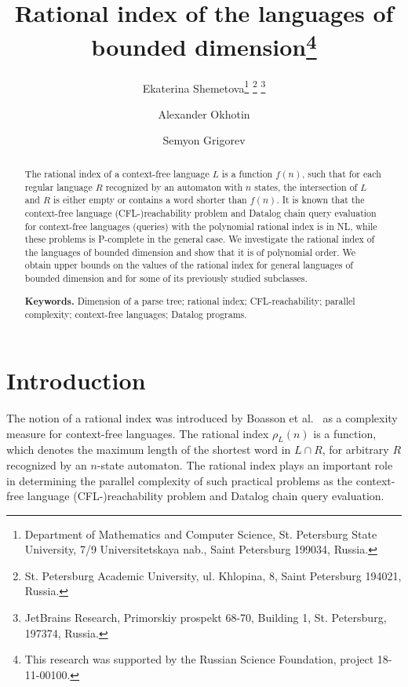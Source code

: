 \documentclass[11pt,a4paper]{article} %
\begin{document}
\sloppy

\title{Rational index of the languages of bounded dimension\footnote{%
This research was supported by the Russian Science Foundation, project 18-11-00100.}}

\author{Ekaterina Shemetova\footnote{%
Department of Mathematics and Computer Science, St. Petersburg State University, 
7/9 Universitetskaya nab., Saint Petersburg 199034, Russia.}
\footnote{%
St. Petersburg Academic University, 
ul. Khlopina, 8, Saint Petersburg 194021, Russia.}
\footnote{%
JetBrains Research,
Primorskiy prospekt 68-70, Building 1, St. Petersburg, 197374, Russia.}
\and
Alexander Okhotin\footnotemark[2]
\and
Semyon Grigorev\footnotemark[2] \footnotemark[4]
}

\maketitle


\begin{abstract}
The rational index of a context-free language  $L$ is a function $f(n)$, such that for each regular language $R$ recognized by an automaton with $n$ states, the intersection of $L$ and $R$ is either empty or contains a word shorter than $f(n)$. It is known that the context-free language (CFL-)reachability problem and Datalog chain query evaluation for context-free languages (queries) with the polynomial rational index is in NL, while these problems is P-complete in the general case. We investigate the rational index of the languages of bounded dimension and show that it is of polynomial order. We obtain upper bounds on the values of the rational index for general languages of bounded dimension and for some of its previously studied subclasses.

\textbf{Keywords.}
Dimension of a parse tree; rational index; CFL-reachability; parallel complexity; context-free languages; Datalog programs.
\end{abstract}


\section{Introduction}
\label{intro}
The notion of a rational index was introduced by Boasson et al.~\cite{RatBasic} as a complexity measure for context-free languages. The rational index $\rho_L(n)$ is a function, which denotes the maximum length of the shortest word in $L \cap R$, for arbitrary $R$ recognized by an $n$-state automaton. The rational index plays an important role in determining the parallel complexity of such practical problems as the context-free language (CFL-)reachability problem and Datalog chain query evaluation.
\end{document}
